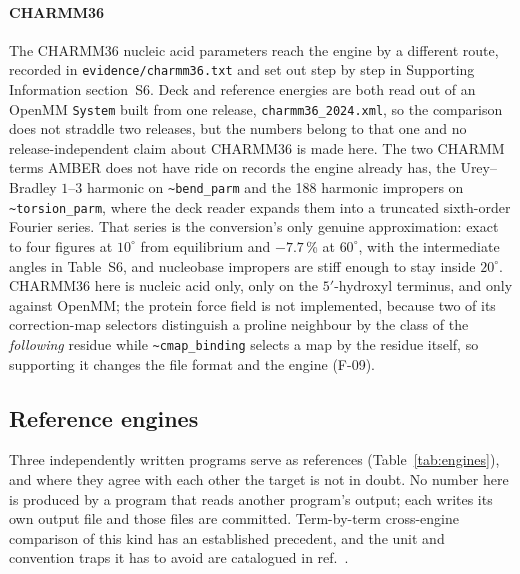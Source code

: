 \paragraph{CHARMM36}
The CHARMM36 nucleic acid parameters\cite{hart2012charmm36dna,denning2011charmm36rna}
reach the engine by a different route, recorded in
\texttt{evidence/charmm36.txt} and set out step by step in Supporting
Information section~S6. Deck and reference energies are both read out of an
OpenMM \texttt{System} built from one release, \texttt{charmm36\_2024.xml}, so
the comparison does not straddle two releases, but the numbers belong to that
one and no release-independent claim about CHARMM36 is made here. The two
CHARMM terms AMBER does not have ride on records the engine already has, the
Urey--Bradley $1$--$3$ harmonic on \texttt{\~{}bend\_parm} and the 188 harmonic
impropers on \texttt{\~{}torsion\_parm}, where the deck reader expands them into
a truncated sixth-order Fourier series. That series is the conversion's only
genuine approximation: exact to four figures at $10^{\circ}$ from equilibrium
and $-7.7$\,\% at $60^{\circ}$, with the intermediate angles in Table~S6, and
nucleobase impropers are stiff enough to stay inside $20^{\circ}$. CHARMM36
here is nucleic acid only, only on the $5'$-hydroxyl terminus, and only against
OpenMM; the protein force field\cite{best2012charmm36} is not implemented,
because two of its correction-map selectors distinguish a proline neighbour by
the class of the \emph{following} residue while \texttt{\~{}cmap\_binding}
selects a map by the residue itself, so supporting it changes the file format
and the engine (F-09).

\subsection{Reference engines}
\label{sec:methods-references}

Three independently written programs serve as references
(Table~\ref{tab:engines}), and where they agree with each other the target is
not in doubt. No number here is produced by a program that reads another
program's output; each writes its own output file and those files are
committed. Term-by-term cross-engine comparison of this kind has an established
precedent\cite{shirts2017engines}, and the unit and convention traps it has to
avoid are catalogued in ref.~\cite{braun2018bestpractices}.

